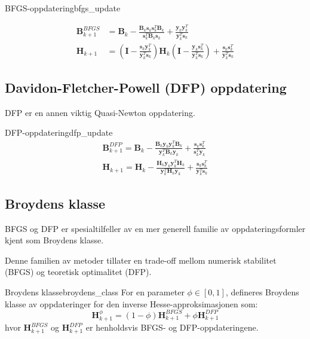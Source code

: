 \begin{definition}{BFGS-oppdatering}{bfgs_update}

	\begin{align*}
		\symbf{B}_{k+1}^{BFGS} & = \symbf{B}_k - \frac{\symbf{B}_k\symbf{s}_k\symbf{s}_k^T\symbf{B}_k}{\symbf{s}_k^T\symbf{B}_k\symbf{s}_k} + \frac{\symbf{y}_k\symbf{y}_k^T}{\symbf{y}_k^T\symbf{s}_k}                                                                          \\
		\symbf{H}_{k+1}        & = \left(\symbf{I} - \frac{\symbf{s}_k\symbf{y}_k^T}{\symbf{y}_k^T\symbf{s}_k}\right) \symbf{H}_k \left(\symbf{I} - \frac{\symbf{y}_k\symbf{s}_k^T}{\symbf{y}_k^T\symbf{s}_k}\right) + \frac{\symbf{s}_k\symbf{s}_k^T}{\symbf{y}_k^T\symbf{s}_k}
	\end{align*}

\end{definition}

\subsection{Davidon-Fletcher-Powell (DFP) oppdatering}
DFP er en annen viktig Quasi-Newton oppdatering.

\begin{definition}{DFP-oppdatering}{dfp_update}
	\begin{align*}
		\symbf{B}_{k+1}^{DFP} = \symbf{B}_k - \frac{\symbf{B}_k\symbf{y}_k\symbf{y}_k^T\symbf{B}_k}{\symbf{y}_k^T\symbf{B}_k\symbf{y}_k} + \frac{\symbf{s}_k\symbf{s}_k^T}{\symbf{s}_k^T\symbf{y}_k} \tag{Oppdatering av Hesse-approksimasjonen} \\
		\symbf{H}_{k+1} = \symbf{H}_k - \frac{\symbf{H}_k\symbf{y}_k\symbf{y}_k^T\symbf{H}_k}{\symbf{y}_k^T\symbf{H}_k\symbf{y}_k} + \frac{\symbf{s}_k\symbf{s}_k^T}{\symbf{y}_k^T\symbf{s}_k} \tag{Oppdatering av invers Hesse-approksimasjonen}
	\end{align*}
\end{definition}

\subsection{Broydens klasse}
BFGS og DFP er spesialtilfeller av en mer generell familie av oppdateringsformler kjent som Broydens klasse.

Denne familien av metoder tillater en trade-off mellom numerisk stabilitet (BFGS) og teoretisk optimalitet (DFP).

\begin{definition}{Broydens klasse}{broydens_class}
	For en parameter $\phi \in [0,1]$, defineres Broydens klasse av oppdateringer for den inverse Hesse-approksimasjonen som:
	\[
		\symbf{H}_{k+1}^\phi = (1-\phi)\symbf{H}_{k+1}^{BFGS} + \phi\symbf{H}_{k+1}^{DFP}
	\]
	hvor $\symbf{H}_{k+1}^{BFGS}$ og $\symbf{H}_{k+1}^{DFP}$ er henholdsvis BFGS- og DFP-oppdateringene.
\end{definition}

